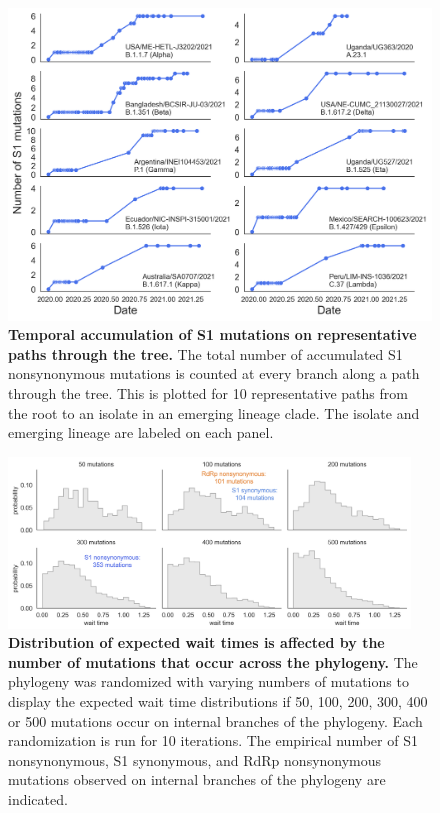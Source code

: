 \documentclass[12pt, letterpaper]{article}
\begin{document}
\begin{figure}[h!]
	\centerline{\includegraphics[scale=0.55]{fig3_supp1.png}}
	\caption{\textbf{Temporal accumulation of S1 mutations on representative paths through the tree.}
	The total number of accumulated S1 nonsynonymous mutations is counted at every branch along a path through the tree. This is plotted for 10 representative paths from the root to an isolate in an emerging lineage clade. The isolate and emerging lineage are labeled on each panel.
	}
	\label{fig:fig3_supp1}
\end{figure}

\begin{figure}[h!]
	\centerline{\includegraphics[width=0.95\textwidth]{fig3_supp2.png}}
	\caption{\textbf{Distribution of expected wait times is affected by the number of mutations that occur across the phylogeny.}
	The phylogeny was randomized with varying numbers of mutations to display the expected wait time distributions if 50, 100, 200, 300, 400 or 500 mutations occur on internal branches of the phylogeny. Each randomization is run for 10 iterations. The empirical number of S1 nonsynonymous, S1 synonymous, and RdRp nonsynonymous mutations observed on internal branches of the phylogeny are indicated.
	}
	\label{fig:fig3_supp2}
\end{figure}
\end{document}
